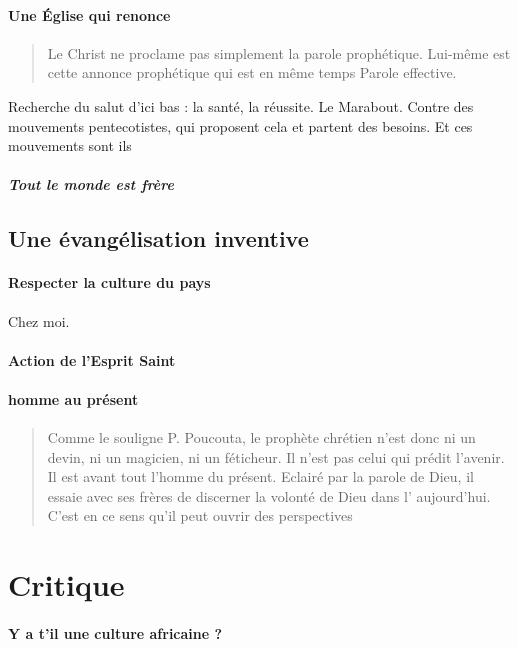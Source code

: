 \paragraph{Une Église qui renonce}
\begin{quote}
    Le Christ ne proclame pas simplement la parole prophétique.
Lui-même est cette annonce prophétique qui est en même
temps Parole effective.
\end{quote}

Recherche du salut d'ici bas : la santé, la réussite. Le Marabout. Contre des mouvements pentecotistes, qui proposent cela et partent des besoins. Et ces mouvements sont ils 

\subparagraph{Tout le monde est frère}

\subsection{Une évangélisation inventive}
\paragraph{Respecter la culture du pays} Chez moi. 

\paragraph{Action de l'Esprit Saint}


\paragraph{homme au présent}
\begin{quote}
    Comme le souligne P. Poucouta, le
prophète chrétien n'est donc ni un devin, ni un magicien, ni un
féticheur. Il n'est pas celui qui prédit l'avenir. Il est avant tout
l'homme du présent. Eclairé par la parole de Dieu, il essaie avec
ses frères de discerner la volonté de Dieu dans l' aujourd'hui.
C'est en ce sens qu'il peut ouvrir des perspectives
\end{quote}
\section{Critique}

\paragraph{Y a t'il une culture africaine ?}

